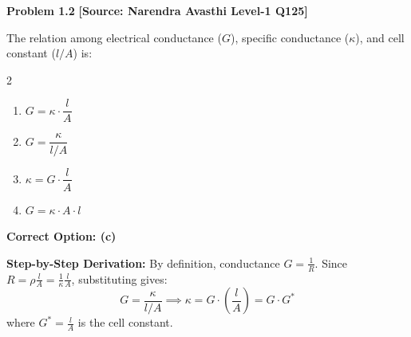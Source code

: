 \begin{problembox}
\textbf{Problem 1.2} \hfill \textbf{[Source: Narendra Avasthi Level-1 Q125]}

The relation among electrical conductance ($G$), specific conductance ($\kappa$), and cell constant ($l/A$) is:
\begin{multicols}{2}
\begin{enumerate}[label=(\alph*)]
    \item $G = \kappa \cdot \dfrac{l}{A}$
    \item $G = \dfrac{\kappa}{l/A}$
    \item $\kappa = G \cdot \dfrac{l}{A}$
    \item $G = \kappa \cdot A \cdot l$
\end{enumerate}
\end{multicols}
\end{problembox}
\begin{solution}
\textbf{Correct Option: (c)}

\textbf{Step-by-Step Derivation:}
By definition, conductance $G = \frac{1}{R}$. Since $R = \rho \frac{l}{A} = \frac{1}{\kappa}\frac{l}{A}$, substituting gives:
\begin{equation*}
    G = \frac{\kappa}{l/A} \implies \kappa = G \cdot \left(\frac{l}{A}\right) = G \cdot G^*
\end{equation*}
where $G^* = \frac{l}{A}$ is the cell constant.
\end{solution}

